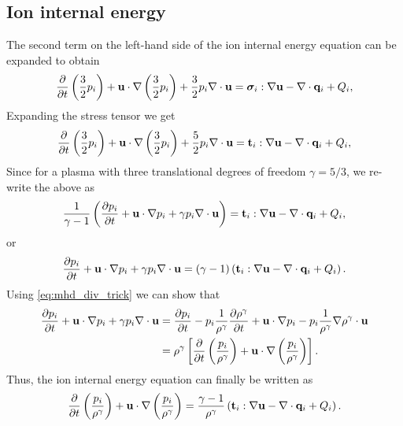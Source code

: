 \documentclass[a4paper,11pt]{report}
\begin{document}
\subsection{Ion internal energy}

The second term on the left-hand side of the ion internal energy equation can be expanded to obtain
\begin{equation*}
    \frac{\partial}{\partial t} \left( \frac{3}{2} p_i \right) + \mathbf{u} \cdot \nabla \left( \frac{3}{2} p_i \right) + \frac{3}{2}p_i \nabla \cdot \mathbf{u} = \bm \sigma_i : \nabla \mathbf{u} - \nabla \cdot \mathbf{q}_i + Q_i,
\end{equation*}
Expanding the stress tensor we get
\begin{equation*}
    \frac{\partial}{\partial t} \left( \frac{3}{2} p_i \right) + \mathbf{u} \cdot \nabla \left( \frac{3}{2} p_i \right) + \frac{5}{2} p_i \nabla \cdot \mathbf{u} = \mathbf{t}_i : \nabla \mathbf{u} - \nabla \cdot \mathbf{q}_i + Q_i,
\end{equation*}
Since for a plasma with three translational degrees of freedom $\gamma = 5/3$, we re-write the above as
\begin{equation*}
    \frac{1}{\gamma - 1} \left( \frac{\partial p_i}{\partial t} + \mathbf{u} \cdot \nabla p_i + \gamma p_i \nabla \cdot \mathbf{u} \right) = \mathbf{t}_i : \nabla \mathbf{u} - \nabla \cdot \mathbf{q}_i + Q_i,
\end{equation*}
or
\begin{equation*}
    \frac{\partial p_i}{\partial t} + \mathbf{u} \cdot \nabla p_i + \gamma p_i \nabla \cdot \mathbf{u} = (\gamma - 1) \left( \mathbf{t}_i : \nabla \mathbf{u} - \nabla \cdot \mathbf{q}_i + Q_i \right). 
\end{equation*}
Using \cref{eq:mhd_div_trick} we can show that
\begin{align*}
    \frac{\partial p_i}{\partial t} + \mathbf{u} \cdot \nabla p_i + \gamma p_i \nabla \cdot \mathbf{u} 
    &=  \frac{\partial p_i}{\partial t} - p_i \frac{1}{\rho^\gamma} \frac{\partial \rho^\gamma}{\partial t} + \mathbf{u} \cdot \nabla p_i - p_i \frac{1}{\rho^\gamma} \nabla \rho^\gamma \cdot \mathbf{u} \nonumber \\
    & = \rho^\gamma \left [ \frac{\partial}{\partial t} \left( \frac{p_i}{\rho^\gamma} \right) + \mathbf{u} \cdot \nabla \left(\frac{p_i}{\rho^\gamma} \right) \right ].
\end{align*}
Thus, the ion internal energy equation can finally be written as
\begin{equation*}
    \frac{\partial}{\partial t} \left( \frac{p_i}{\rho^\gamma} \right) + \mathbf{u} \cdot \nabla \left(\frac{p_i}{\rho^\gamma} \right) = \frac{\gamma - 1}{\rho^\gamma} \left( \mathbf{t}_i : \nabla \mathbf{u} - \nabla \cdot \mathbf{q}_i + Q_i \right).
\end{equation*}
\end{document}
